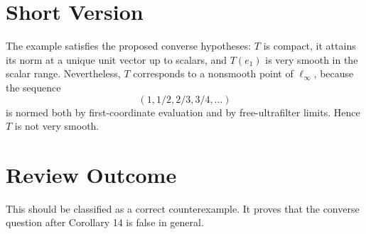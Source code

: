 \documentclass[11pt]{article}
\begin{document}
\section*{Short Version}

The example satisfies the proposed converse hypotheses: \(T\) is compact, it attains its norm at a unique unit vector up to scalars, and \(T(e_1)\) is very smooth in the scalar range. Nevertheless, \(T\) corresponds to a nonsmooth point of \(\ell_\infty\), because the sequence
\[
(1,1/2,2/3,3/4,\ldots)
\]
is normed both by first-coordinate evaluation and by free-ultrafilter limits. Hence \(T\) is not very smooth.

\section*{Review Outcome}

This should be classified as a correct counterexample. It proves that the converse question after Corollary 14 is false in general.
\end{document}
